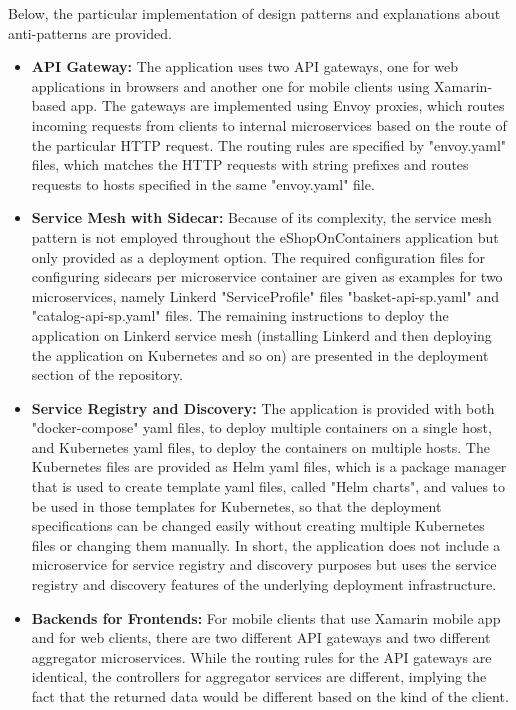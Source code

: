 \documentclass{Configuration_Files/PoliMi3i_thesis}
\begin{document}
Below, the particular implementation of design patterns and explanations about anti-patterns are provided.

\begin{itemize}
    \item \textbf{API Gateway:} The application uses two API gateways, one for web applications in browsers and another one for mobile clients using Xamarin-based app.
    The gateways are implemented using Envoy\footnotemark[66] proxies, which routes incoming requests from clients to internal microservices based on the route of the particular HTTP request.
    The routing rules are specified by "envoy.yaml" files, which matches the HTTP requests with string prefixes and routes requests to hosts specified in the same "envoy.yaml" file.
    
    \item \textbf{Service Mesh with Sidecar:} Because of its complexity, the service mesh pattern is not employed throughout the eShopOnContainers application but only provided as a deployment option.
    The required configuration files for configuring sidecars per microservice container are given as examples for two microservices, namely Linkerd "ServiceProfile" files "basket-api-sp.yaml" and "catalog-api-sp.yaml" files.
    The remaining instructions to deploy the application on Linkerd service mesh (installing Linkerd and then deploying the application on Kubernetes and so on) are presented in the deployment section of the repository.
    
    \item \textbf{Service Registry and Discovery:} The application is provided with both "docker-compose" yaml files, to deploy multiple containers on a single host, and Kubernetes yaml files, to deploy the containers on multiple hosts. 
    The Kubernetes files are provided as Helm\footnotemark[67] yaml files, which is a package manager that is used to create template yaml files, called "Helm charts", and values to be used in those templates for Kubernetes, so that the deployment specifications can be changed easily without creating multiple Kubernetes files or changing them manually.
    In short, the application does not include a microservice for service registry and discovery purposes but uses the service registry and discovery features of the underlying deployment infrastructure.
    
    \item \textbf{Backends for Frontends:} For mobile clients that use Xamarin mobile app and for web clients, there are two different API gateways and two different aggregator microservices.
    While the routing rules for the API gateways are identical, the controllers for aggregator services are different, implying the fact that the returned data would be different based on the kind of the client.
    

\end{itemize}
\end{document}
